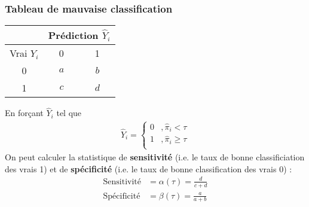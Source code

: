 \documentclass[10pt, french]{article}
\begin{document}
\begin{multicols*}{3}
\subsubsection*{Tableau de mauvaise classification}
\begin{center}
\begin{tabular}{|c|c|c|}
\hline
  & \multicolumn{2}{c|}{Prédiction $\hat{Y}_i$} \\ \hline
Vrai $Y_i$ & 0 & 1 \\ 
  \hline
0 & $a$ & $b$ \\ 
  1 & $c$ & $d$ \\ 
   \hline
\end{tabular}
\end{center}
En forçant $\hat{Y}_i$ tel que
\begin{align*}
\hat{Y}_i = 
\begin{cases}
0	& , \hat{\pi}_i < \tau \\
1	& , \hat{\pi}_i \geq \tau \\
\end{cases}
\end{align*}
On peut calculer la statistique de \textbf{sensitivité} (i.e. le taux de bonne classificiation des vrais 1) et de \textbf{spécificité} (i.e. le taux de bonne classification des vrais 0) : 
\begin{align*}
\text{Sensitivité}	& = \alpha(\tau) = \frac{d}{c+d} \\
\text{Spécificité}	& = \beta(\tau) = \frac{a}{a+b} \\
\end{align*}






\end{multicols*}
\end{document}
